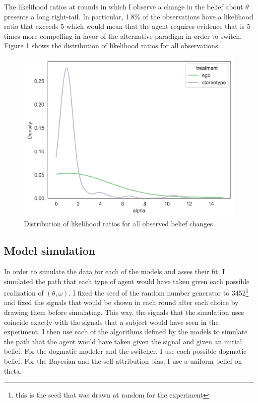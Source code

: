 \documentclass[
  12pt,
]{article}
\begin{document}
The likelihood ratios at rounds in which I observe a change in the
belief about \(\theta\) presents a long right-tail. In particular, 1.8\%
of the observations have a likelihood ratio that exceeds 5 which would
mean that the agent requires evidence that is 5 times more compelling in
favor of the alternative paradigm in order to switch. Figure
\ref{fig:lr-hist} shows the distribution of likelihood ratios for all
observations.

\begin{figure}
\hypertarget{fig:lr-hist}{%
\centering
\includegraphics{../figures/lr_hist.png}
\caption{Distribution of likelihood ratios for all observed belief
changes}\label{fig:lr-hist}
}
\end{figure}

\hypertarget{model-simulation}{%
\subsection{Model simulation}\label{model-simulation}}

In order to simulate the data for each of the models and asses their
fit, I simulated the path that each type of agent would have taken given
each possible realization of \((\theta, \omega)\). I fixed the seed of
the random number generator to
3452\footnote{this is the seed that was drawn at random for the experiment}
and fixed the signals that would be shown in each round after each
choice by drawing them before simulating. This way, the signals that the
simulation uses coincide exactly with the signals that a subject would
have seen in the experiment. I then use each of the algorithms defined
by the models to simulate the path that the agent would have taken given
the signal and given an initial belief. For the dogmatic modeler and the
switcher, I use each possible dogmatic belief. For the Bayesian and the
self-attribution bias, I use a uniform belief on theta.
\end{document}

